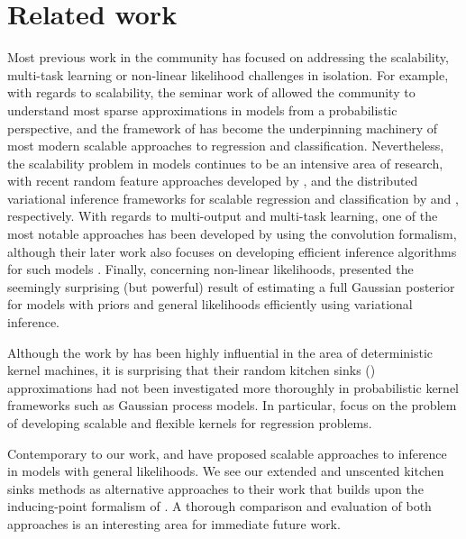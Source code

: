 \section{Related work}
Most previous work in the \gp community has focused on addressing  
the scalability, multi-task learning or non-linear likelihood challenges in
isolation. For example, with regards to scalability, the seminar work of \citet{quinonero2005unifying} allowed the 
community to understand most sparse approximations in \gp models from a probabilistic perspective, 
 and the   framework of \citet{titsias2009variational} has become the  underpinning  machinery
 of  most modern scalable approaches to \gp regression and classification.  
 Nevertheless, the scalability 
 problem in \gp models continues to be an intensive area of research, with
 recent random feature approaches developed 
 by \citet{yang-et-al-aistats-2015}, and the distributed variational inference
 frameworks for scalable \gp regression and classification by 
 \citet{hensmangaussian} and \citet{hensman-et-al-aistats-2015}, respectively. 
 With regards to multi-output and multi-task learning,  one of the most notable approaches has 
 been developed by  \citet{alvarez-lawrence-nips-08} using the convolution formalism, although 
 their later work also focuses on developing efficient inference algorithms for such models
\citep{alvarez2011computationally}.
%
 Finally, concerning non-linear likelihoods, \citet{opper-arch-nc-2009} presented 
 the seemingly surprising (but powerful) result of estimating a full Gaussian posterior 
for models with \gp priors and general \iid  likelihoods efficiently using variational inference.  
 
Although the work by \citet{rahimi-recht-nips-2007,rahimi-recht-nips-2008} has been highly 
influential in the area of deterministic kernel machines, it is surprising that their 
random kitchen sinks (\rks) approximations had not been investigated more 
thoroughly in probabilistic kernel frameworks 
such as Gaussian process models. 
In particular,  \citet{yang-et-al-aistats-2015}  focus on the problem of developing scalable 
and flexible kernels for regression problems. 

Contemporary to our work,  \citet{hensman-et-al-nips-2015} and \citet{dezfouli-bonilla-nips-2015}   
have  proposed scalable approaches to inference in \gp models with general likelihoods. 
We see our extended and unscented kitchen sinks methods as alternative approaches to their
work that builds upon the inducing-point formalism of \citet{titsias2009variational}.
A thorough comparison and evaluation of both approaches is  an interesting 
area for immediate future work.

 
